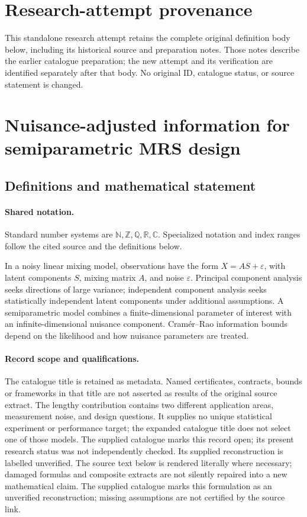 \documentclass[11pt]{article}
\begin{document}
\section*{Research-attempt provenance}
This standalone research attempt retains the complete original definition body below,
including its historical source and preparation notes. Those notes describe the
earlier catalogue preparation; the new attempt and its verification are identified
separately after that body. No original ID, catalogue status, or source statement is changed.

\section{Nuisance-adjusted information for semiparametric MRS design}\label{statement}

\subsection{Definitions and mathematical statement}

\paragraph{Shared notation.}Standard number systems are $\mathbb N,\mathbb Z,\mathbb Q,\mathbb R,\mathbb C$. Specialized notation and index ranges follow the cited source and the definitions below.


In a noisy linear mixing model, observations have the form $X=AS+\varepsilon$, with latent components $S$, mixing matrix $A$, and noise $\varepsilon$. Principal component analysis seeks directions of large variance; independent component analysis seeks statistically independent latent components under additional assumptions. A semiparametric model combines a finite-dimensional parameter of interest with an infinite-dimensional nuisance component. Cramér--Rao information bounds depend on the likelihood and how nuisance parameters are treated.
\paragraph{Record scope and qualifications.}
The catalogue title is retained as metadata. Named certificates, contracts, bounds or frameworks in that title are not asserted as results of the original source extract.
The lengthy contribution contains two different application areas, measurement noise, and design questions. It supplies no unique statistical experiment or performance target; the expanded catalogue title does not select one of those models. The supplied catalogue marks this record open; its present research status was not independently checked. Its supplied reconstruction is labelled unverified.
The source text below is rendered literally where necessary; damaged formulas and composite extracts are not silently repaired into a new mathematical claim.
The supplied catalogue marks this formulation as an unverified reconstruction; missing assumptions are not certified by the source link.
\end{document}
